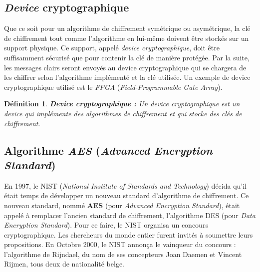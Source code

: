 \documentclass[oneside]{book}
\newtheorem{definition}{Définition}[section]
\begin{document}
\subsection{\textit{Device} cryptographique}
\label{sec:Introduction}

Que ce soit pour un algorithme de chiffrement symétrique ou asymétrique, la clé de chiffrement tout comme l'algorithme en lui-même doivent être stockés sur un support physique. Ce support, appelé \textit{device cryptographique}, doit être suffisamment sécurisé que pour contenir la clé de manière protégée. Par la suite, les messages clairs seront envoyés au device cryptographique qui se chargera de les chiffrer selon l'algorithme implémenté et la clé utilisée. Un exemple de device cryptographique utilisé est le \textit{FPGA} (\textit{Field-Programmable Gate Array}).

\theoremstyle{definition}
\begin{definition}{\textbf{Device cryptographique :}}
Un device cryptographique est un device qui implémente des algorithmes de chiffrement et qui stocke des clés de chiffrement.
\end{definition}

\newpage

\subsection{Algorithme \textit{AES} (\textit{Advanced Encryption Standard})}
\label{subsec:AES}

En 1997, le NIST (\textit{National Institute of Standards and Technology}) décida qu'il était temps de développer un nouveau standard d'algorithme de chiffrement. Ce nouveau standard, nommé \textbf{AES} (pour \textit{Advanced Encryption Standard}), était appelé à remplacer l'ancien standard de chiffrement, l'algorithme DES (pour \textit{Data Encryption Standard}). Pour ce faire, le NIST organisa un concours cryptographique. Les chercheurs du monde entier furent invités à soumettre leurs propositions. En Octobre 2000, le NIST annonça le vainqueur du concours : l'algorithme de Rijndael, du nom de ses concepteurs Joan Daemen et Vincent Rijmen, tous deux de nationalité belge.
\end{document}

